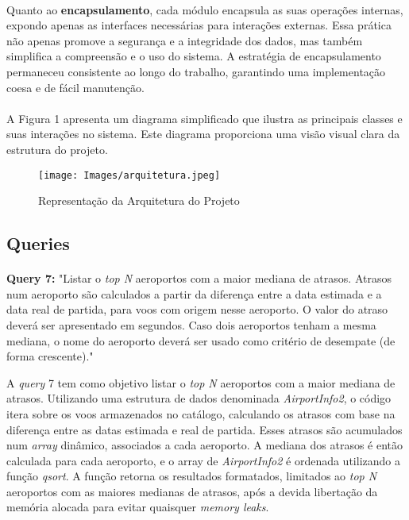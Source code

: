 \documentclass{article}
\begin{document}
\paragraph{}Quanto ao \textbf{encapsulamento}, cada módulo encapsula as suas operações internas, expondo apenas as interfaces necessárias para interações externas. Essa prática não apenas promove a segurança e a integridade dos dados, mas também simplifica a compreensão e o uso do sistema. A estratégia de encapsulamento permaneceu consistente ao longo do trabalho, garantindo uma implementação coesa e de fácil manutenção.
\vspace{-0.3cm}
\paragraph{}A Figura 1 apresenta um diagrama simplificado que ilustra as principais classes e suas interações no sistema. Este diagrama proporciona uma visão visual clara da estrutura do projeto.
\begin{figure}[H]
\begin{center}
	\texttt{[image: Images/arquitetura.jpeg]} 
        \caption{Representação da Arquitetura do Projeto}
\end{center}
\end{figure}


\subsection{Queries}
\paragraph{}\textbf{Query 7:} "Listar o \textit{top N} aeroportos com a maior mediana de atrasos. Atrasos num aeroporto são calculados a partir da diferença entre a data estimada e a data real de partida, para voos com origem nesse aeroporto. O valor do atraso deverá ser apresentado em segundos. Caso dois aeroportos tenham a mesma mediana, o nome do aeroporto deverá ser usado como critério de desempate (de forma crescente)."

A \textit{query} 7 tem como objetivo listar o \textit{top N} aeroportos com a maior mediana de atrasos. Utilizando uma estrutura de dados denominada \textit{AirportInfo2}, o código itera sobre os voos armazenados no catálogo, calculando os atrasos com base na diferença entre as datas estimada e real de partida. Esses atrasos são acumulados num \textit{array} dinâmico, associados a cada aeroporto. A mediana dos atrasos é então calculada para cada aeroporto, e o array de \textit{AirportInfo2} é ordenada utilizando a função \textit{qsort}. A função retorna os resultados formatados, limitados ao \textit{top N} aeroportos com as maiores medianas de atrasos, após a devida libertação da memória alocada para evitar quaisquer \textit{memory leaks}.
\end{document}
